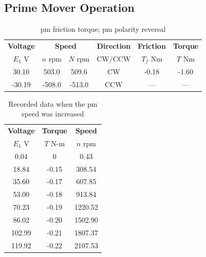 \documentclass{article}
\begin{document}
\subsection{Prime Mover Operation}

\begin{table}[H]
  \centering
  \begin{tabular}{*{6}{c}}
    \textbf{Voltage} & \multicolumn{2}{c}{\textbf{Speed}} & \textbf{Direction}
    & \textbf{Friction} & \textbf{Torque} \\
    $E_1$ V & $n$ rpm & $N$ rpm & CW/CCW & $T_f$ Nm & $T$ Nm \\
    \hline
     30.10 &  503.0 &  509.6 &  CW & -0.18 & -1.60 \\
    -30.19 & -508.0 & -513.0 & CCW &   --- &   --- \\
  \end{tabular}
  \caption{\gls{pm} friction torque; \gls{pm} polarity reversal}
  \label{tab:table_01}
\end{table}

\begin{table}[H]
  \centering
  \begin{tabular}{*{3}{c}}
    \textbf{Voltage} & \textbf{Torque} & \textbf{Speed} \\
    $E_1$ V          & $T$ N-m         & $n$ rpm \\

    \hline

      0.04 &     0 &    0.43 \\
     18.84 & -0.15 &  308.54 \\
     35.60 & -0.17 &  607.85 \\
     53.00 & -0.18 &  913.84 \\
     70.23 & -0.19 & 1220.52 \\
     86.02 & -0.20 & 1502.90 \\
    102.99 & -0.21 & 1807.37 \\
    119.92 & -0.22 & 2107.53 \\
  \end{tabular}
  \caption{Recorded data when the \gls{pm} speed was increased}
  \label{tab:table_02}
\end{table}
\end{document}
